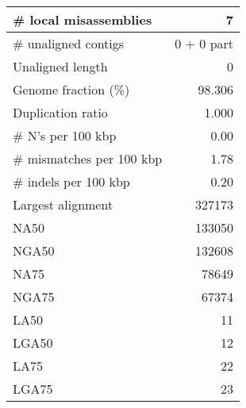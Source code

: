 \documentclass[12pt,a4paper]{article}
\begin{document}
\begin{table}[ht]
\begin{center}
\begin{tabular}{|l*{1}{|r}|}
\# local misassemblies & 7 \\ \hline
\# unaligned contigs & 0 + 0 part \\ \hline
Unaligned length & 0 \\ \hline
Genome fraction (\%) & 98.306 \\ \hline
Duplication ratio & 1.000 \\ \hline
\# N's per 100 kbp & 0.00 \\ \hline
\# mismatches per 100 kbp & 1.78 \\ \hline
\# indels per 100 kbp & 0.20 \\ \hline
Largest alignment & 327173 \\ \hline
NA50 & 133050 \\ \hline
NGA50 & 132608 \\ \hline
NA75 & 78649 \\ \hline
NGA75 & 67374 \\ \hline
LA50 & 11 \\ \hline
LGA50 & 12 \\ \hline
LA75 & 22 \\ \hline
LGA75 & 23 \\ \hline
\end{tabular}
\end{center}
\end{table}
\end{document}
